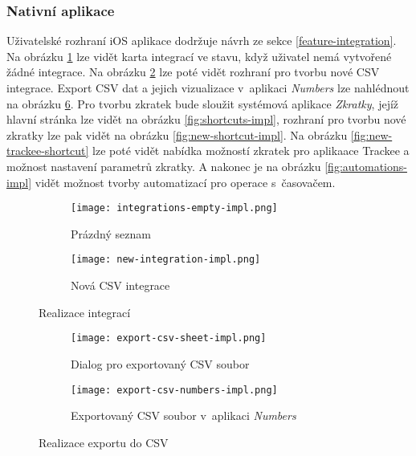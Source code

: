 \subsubsection{Nativní aplikace}

Uživatelské rozhraní iOS aplikace dodržuje návrh ze sekce \ref{feature-integration}. Na obrázku \ref{fig:integrations-empty-impl} lze vidět karta integrací ve stavu, když uživatel nemá vytvořené žádné integrace. Na obrázku \ref{fig:new-integration-impl} lze poté vidět rozhraní pro tvorbu nové CSV integrace. Export CSV dat a jejich vizualizace v~aplikaci \emph{Numbers} lze nahlédnout na obrázku \ref{fig:export-csv-impl}. Pro tvorbu zkratek bude sloužit systémová aplikace \emph{Zkratky}, jejíž hlavní stránka lze vidět na obrázku \ref{fig:shortcuts-impl}, rozhraní pro tvorbu nové zkratky lze pak vidět na obrázku \ref{fig:new-shortcut-impl}. Na obrázku \ref{fig:new-trackee-shortcut} lze poté vidět nabídka možností zkratek pro aplikaace Trackee a možnost nastavení parametrů zkratky. A nakonec je na obrázku \ref{fig:automations-impl} vidět možnost tvorby automatizací pro operace s~časovačem.

\begin{figure}[p]
    \centering
    \begin{subfigure}[b]{0.4\textwidth}
		\centering
		\texttt{[image: integrations-empty-impl.png]}
		\caption{Prázdný seznam}
		\label{fig:integrations-empty-impl}
	\end{subfigure}
	\hspace{2cm}
	\begin{subfigure}[b]{0.4\textwidth}
		\centering
		\texttt{[image: new-integration-impl.png]}
		\caption{Nová CSV integrace}
		\label{fig:new-integration-impl}
	\end{subfigure}
	\caption{Realizace integrací}
	\label{fig:integrations-impl}
\end{figure}

\begin{figure}[p]
    \centering
    \begin{subfigure}[b]{0.4\textwidth}
		\centering
		\texttt{[image: export-csv-sheet-impl.png]}
		\caption{Dialog pro exportovaný CSV soubor}
		\label{fig:export-csv-sheet-impl}
	\end{subfigure}
	\hspace{2cm}
	\begin{subfigure}[b]{0.4\textwidth}
		\centering
		\texttt{[image: export-csv-numbers-impl.png]}
		\caption{Exportovaný CSV soubor v~aplikaci \emph{Numbers}}
		\label{fig:export-csv-numbers-impl}
	\end{subfigure}
	\caption{Realizace exportu do CSV}
	\label{fig:export-csv-impl}
\end{figure}

